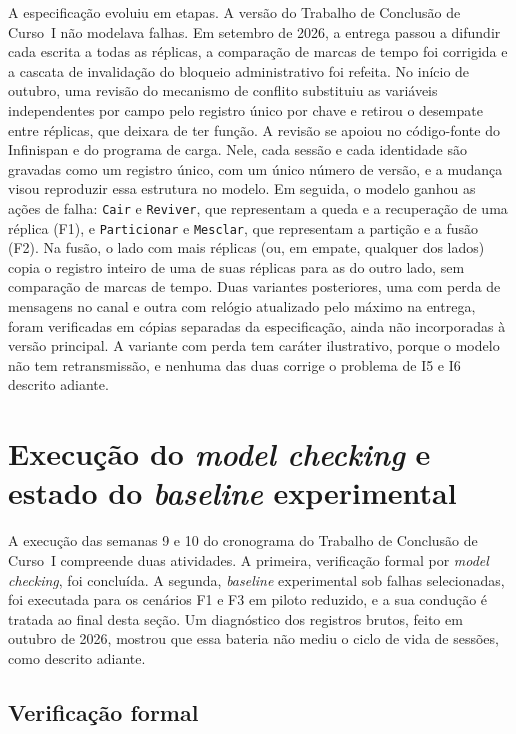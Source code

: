 A especificação evoluiu em etapas. A versão do Trabalho de Conclusão de Curso~I não modelava falhas. Em setembro de 2026, a entrega passou a difundir cada escrita a todas as réplicas, a comparação de marcas de tempo foi corrigida e a cascata de invalidação do bloqueio administrativo foi refeita. No início de outubro, uma revisão do mecanismo de conflito substituiu as variáveis independentes por campo pelo registro único por chave e retirou o desempate entre réplicas, que deixara de ter função. A revisão se apoiou no código-fonte do Infinispan e do programa de carga. Nele, cada sessão e cada identidade são gravadas como um registro único, com um único número de versão, e a mudança visou reproduzir essa estrutura no modelo. Em seguida, o modelo ganhou as ações de falha: \texttt{Cair} e \texttt{Reviver}, que representam a queda e a recuperação de uma réplica (F1), e \texttt{Particionar} e \texttt{Mesclar}, que representam a partição e a fusão (F2). Na fusão, o lado com mais réplicas (ou, em empate, qualquer dos lados) copia o registro inteiro de uma de suas réplicas para as do outro lado, sem comparação de marcas de tempo. Duas variantes posteriores, uma com perda de mensagens no canal e outra com relógio atualizado pelo máximo na entrega, foram verificadas em cópias separadas da especificação, ainda não incorporadas à versão principal. A variante com perda tem caráter ilustrativo, porque o modelo não tem retransmissão, e nenhuma das duas corrige o problema de I5 e I6 descrito adiante.

\section{Execução do \emph{model checking} e estado do \emph{baseline} experimental}
\label{sec-plano-execucao}

A execução das semanas 9 e 10 do cronograma do Trabalho de Conclusão de Curso~I compreende duas atividades. A primeira, verificação formal por \emph{model checking}, foi concluída. A segunda, \emph{baseline} experimental sob falhas selecionadas, foi executada para os cenários F1 e F3 em piloto reduzido, e a sua condução é tratada ao final desta seção. Um diagnóstico dos registros brutos, feito em outubro de 2026, mostrou que essa bateria não mediu o ciclo de vida de sessões, como descrito adiante.

\subsection*{Verificação formal}
\label{sec-mc-resultados}

